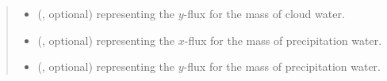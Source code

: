 \documentclass[letterpaper,10pt,english]{sphinxmanual}
\begin{document}
\begin{fulllineitems}
\begin{fulllineitems}
\begin{quote}
\begin{description}
\begin{itemize}
\item {} 
 (, optional) \textendash{}  representing the \(y\)-flux for the mass of cloud water.

\item {} 
 (, optional) \textendash{}  representing the \(x\)-flux for the mass of precipitation water.

\item {} 
 (, optional) \textendash{}  representing the \(y\)-flux for the mass of precipitation water.

\end{itemize}


\end{description}\end{quote}

\end{fulllineitems}


\end{fulllineitems}

\end{document}
